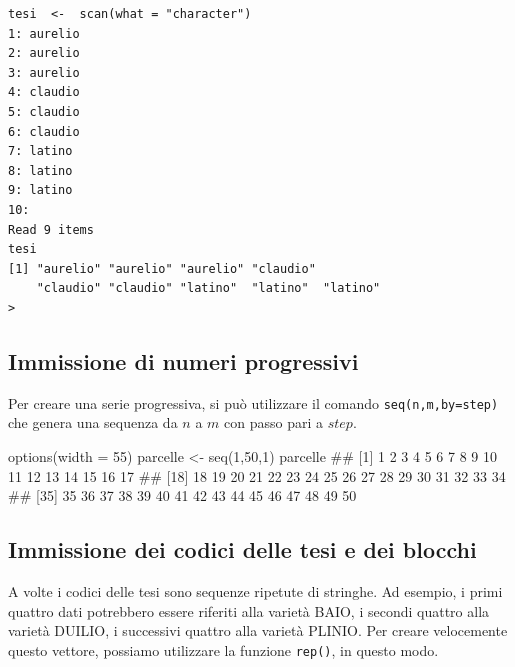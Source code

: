 \documentclass[a4paper,12pt,oneside]{book}
\newenvironment{Shaded}{}{}
\newcommand{\KeywordTok}[1]{#1}
\newcommand{\DataTypeTok}[1]{#1}
\newcommand{\DecValTok}[1]{#1}
\newcommand{\StringTok}[1]{#1}
\newcommand{\CommentTok}[1]{#1}
\newcommand{\NormalTok}[1]{#1}
\begin{document}
\begin{verbatim}
tesi  <-  scan(what = "character")
1: aurelio
2: aurelio
3: aurelio
4: claudio
5: claudio
6: claudio
7: latino
8: latino
9: latino
10: 
Read 9 items
tesi
[1] "aurelio" "aurelio" "aurelio" "claudio" 
    "claudio" "claudio" "latino"  "latino"  "latino" 
>
\end{verbatim}

\hypertarget{immissione-di-numeri-progressivi}{%
\subsection*{Immissione di numeri progressivi}\label{immissione-di-numeri-progressivi}}

Per creare una serie progressiva, si può utilizzare il comando \texttt{seq(n,m,by=step)} che genera una sequenza da \(n\) a \(m\) con passo pari a \(step\).

\begin{Shaded}
\begin{Highlighting}[]
\KeywordTok{options}\NormalTok{(}\DataTypeTok{width =} \DecValTok{55}\NormalTok{)}
\NormalTok{parcelle  <-}\StringTok{  }\KeywordTok{seq}\NormalTok{(}\DecValTok{1}\NormalTok{,}\DecValTok{50}\NormalTok{,}\DecValTok{1}\NormalTok{)}
\NormalTok{parcelle}
\CommentTok{##  [1]  1  2  3  4  5  6  7  8  9 10 11 12 13 14 15 16 17}
\CommentTok{## [18] 18 19 20 21 22 23 24 25 26 27 28 29 30 31 32 33 34}
\CommentTok{## [35] 35 36 37 38 39 40 41 42 43 44 45 46 47 48 49 50}
\end{Highlighting}
\end{Shaded}

\hypertarget{immissione-dei-codici-delle-tesi-e-dei-blocchi}{%
\subsection*{Immissione dei codici delle tesi e dei blocchi}\label{immissione-dei-codici-delle-tesi-e-dei-blocchi}}

A volte i codici delle tesi sono sequenze ripetute di stringhe. Ad esempio, i primi quattro dati potrebbero essere riferiti alla varietà BAIO, i secondi quattro alla varietà DUILIO, i successivi quattro alla varietà PLINIO. Per creare velocemente questo vettore, possiamo utilizzare la funzione \texttt{rep()}, in questo modo.
\end{document}
